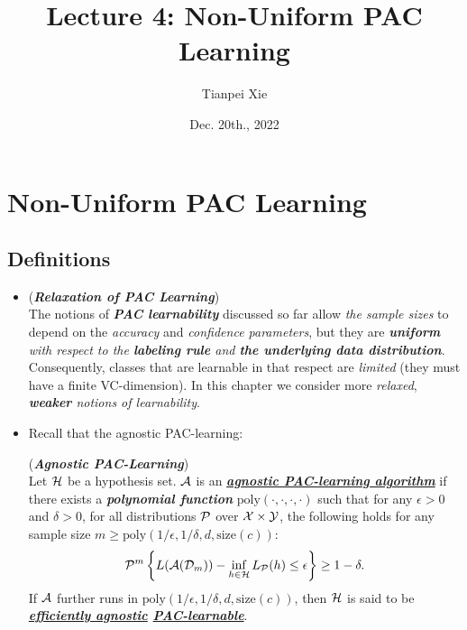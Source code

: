 \documentclass[11pt]{article}
\begin{document}
\title{Lecture 4: Non-Uniform PAC Learning}
\author{ Tianpei Xie}
\date{Dec. 20th., 2022}
\maketitle
\tableofcontents
\newpage
\section{Non-Uniform PAC Learning}
\subsection{Definitions}
\begin{itemize}
\item \begin{remark} (\emph{\textbf{Relaxation of PAC Learning}})\\
The notions of \emph{\textbf{PAC learnability}} discussed so far allow \emph{the sample sizes} to depend on the \emph{accuracy} and \emph{confidence parameters}, but they are \emph{\textbf{uniform} with respect to the \textbf{labeling rule} and \textbf{the underlying data distribution}}. Consequently, classes that are learnable in that respect are \emph{limited} (they must have a finite VC-dimension). In this chapter we consider more \emph{relaxed}, \emph{\textbf{weaker} notions of learnability}. 
\end{remark}

\item Recall that the agnostic PAC-learning:
 \begin{definition} (\emph{\textbf{Agnostic PAC-Learning}})\\
Let ${\mathcal H}$ be a hypothesis set. ${\mathcal A}$ is an \underline{\emph{\textbf{agnostic PAC-learning algorithm}}} if there
exists a \emph{\textbf{polynomial function}} $\text{poly}(\cdot, \cdot, \cdot, \cdot)$  such that for any $\epsilon > 0$ and $\delta > 0$,
for all distributions ${\mathcal P}$ over ${\mathcal X} \times {\mathcal Y}$, the following holds for any sample size $m \ge \text{poly}(1/\epsilon, 1/\delta, d, \text{size}(c))$:
\begin{align}
{\mathcal P}^m\left\{L({\mathcal A}({\mathcal D}_{m})) - \inf_{h \in {\mathcal H}}L_{{\mathcal P}}(h)  \le \epsilon \right\} \ge 1 - \delta. \label{eqn: agnostic_pac_definition}
\end{align} If ${\mathcal A}$ further runs in $\text{poly}(1/\epsilon, 1/\delta, d, \text{size}(c))$, then ${\mathcal H}$ is said to be \emph{\textbf{\underline{efficiently agnostic} \underline{PAC-learnable}}}. 
\end{definition}


\end{itemize}
\end{document}
